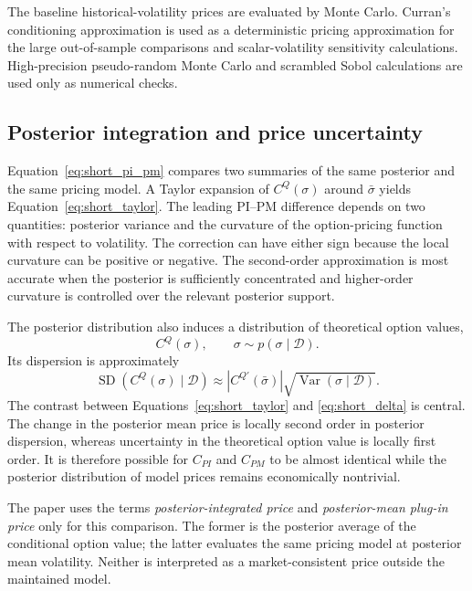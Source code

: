 The baseline historical-volatility prices are evaluated by Monte Carlo. Curran's conditioning approximation \citep{curran1994} is used as a deterministic pricing approximation for the large out-of-sample comparisons and scalar-volatility sensitivity calculations. High-precision pseudo-random Monte Carlo and scrambled Sobol calculations are used only as numerical checks.

\subsection{Posterior integration and price uncertainty}

Equation~\eqref{eq:short_pi_pm} compares two summaries of the same posterior and the same pricing model. A Taylor expansion of \(C^Q(\sigma)\) around \(\bar\sigma\) yields Equation~\eqref{eq:short_taylor}. The leading PI--PM difference depends on two quantities: posterior variance and the curvature of the option-pricing function with respect to volatility. The correction can have either sign because the local curvature can be positive or negative. The second-order approximation is most accurate when the posterior is sufficiently concentrated and higher-order curvature is controlled over the relevant posterior support.

The posterior distribution also induces a distribution of theoretical option values,
\begin{equation}
 C^Q(\sigma),\qquad \sigma\sim p(\sigma\mid\mathcal D).
 \label{eq:short_pushforward}
\end{equation}
Its dispersion is approximately
\begin{equation}
 \operatorname{SD}\!\left(C^Q(\sigma)\mid\mathcal D\right)
 \approx
 \left|C^{Q\prime}(\bar\sigma)\right|
 \sqrt{\operatorname{Var}(\sigma\mid\mathcal D)}.
 \label{eq:short_delta}
\end{equation}
The contrast between Equations~\eqref{eq:short_taylor} and \eqref{eq:short_delta} is central. The change in the posterior mean price is locally second order in posterior dispersion, whereas uncertainty in the theoretical option value is locally first order. It is therefore possible for \(C_{PI}\) and \(C_{PM}\) to be almost identical while the posterior distribution of model prices remains economically nontrivial.

The paper uses the terms \emph{posterior-integrated price} and \emph{posterior-mean plug-in price} only for this comparison. The former is the posterior average of the conditional option value; the latter evaluates the same pricing model at posterior mean volatility. Neither is interpreted as a market-consistent price outside the maintained model.


